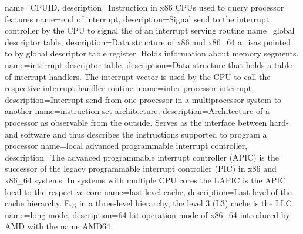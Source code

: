 
%
{
    name=CPUID,
    description={Instruction in x86 CPUs used to query processor features}
}
%
{
    name=end of interrupt,
    description={Signal send to the interrupt controller by the CPU to signal the of an interrupt serving routine}
}
%
{
    name=global descriptor table,
    description={Data structure of x86 and x86\_64 \acrshort{a_isa}s pointed to by global descriptor table register.
            Holds information about memory segments.}
}
%
{
    name=interrupt descriptor table,
    description={Data structure that holds a table of interrupt handlers. The interrupt vector is used by the CPU to
            call the respective interrupt handler routine.}
}
{
    name=inter-processor interrupt,
    description={Interrupt send from one processor in a multiprocessor system to another}
}
{
    name=instruction set architecture,
    description={Architecture of a processor as observable from the outside. Serves as the interface between hard- and
            software and thus describes the instructions supported to program a processor}
}
%
{
    name=local advanced programmable interrupt controller,
    description={The advanced programmable interrupt controller (APIC) is the successor of the legacy programmable
            interrupt controller (PIC) in x86 and x86\_64 systems. In systems with multiple CPU cores the LAPIC is the
            APIC local to the respective core}
}
{
    name=last level cache,
    description={Last level of the cache hierarchy. E.g in a three-level hierarchy, the level 3 (L3) cache is the LLC}
}
{
    name=long mode,
    description={64 bit operation mode of x86\_64 introduced by AMD with the name AMD64}
}
